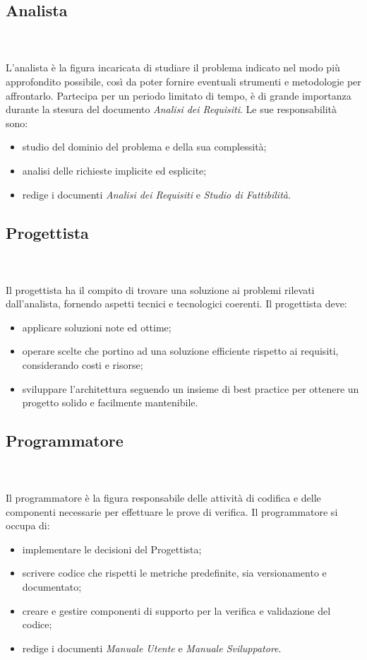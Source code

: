			\subsection{Analista} \mbox{}\\ \mbox{}\\
			L'analista è la figura incaricata di studiare il problema indicato nel modo più approfondito possibile, così da poter fornire eventuali strumenti e metodologie per affrontarlo. 
			Partecipa per un periodo limitato di tempo, è di grande importanza durante la stesura del documento \textit{Analisi dei Requisiti}.\newline
			Le sue responsabilità sono:
			\begin{itemize}
				\item studio del dominio del problema e della sua complessità;
				\item analisi delle richieste implicite ed esplicite;
				\item redige i documenti \textit{Analisi dei Requisiti} e \textit{Studio di Fattibilità}.
			\end{itemize}
			\subsection{Progettista} \mbox{}\\ \mbox{}\\
			Il progettista ha il compito di trovare una soluzione ai problemi rilevati dall'analista, fornendo aspetti tecnici e tecnologici coerenti.\newline
			Il progettista deve:
			\begin{itemize}
				\item applicare soluzioni note ed ottime;
				\item operare scelte che portino ad una soluzione efficiente rispetto ai requisiti, considerando costi e risorse;
				\item sviluppare l'architettura seguendo un insieme di best practice per ottenere un progetto solido e facilmente mantenibile.
			\end{itemize}
			\subsection{Programmatore} \mbox{}\\ \mbox{}\\
			Il programmatore è la figura responsabile delle attività di codifica e delle componenti necessarie per effettuare le prove di verifica.
			Il programmatore si occupa di:
			\begin{itemize}
				\item implementare le decisioni del Progettista;
				\item scrivere codice che rispetti le metriche predefinite, sia versionamento e documentato;
				\item creare e gestire componenti di supporto per la verifica e validazione del codice;
				\item redige i documenti \textit{Manuale Utente} e \textit{Manuale Sviluppatore}.
			\end{itemize}
